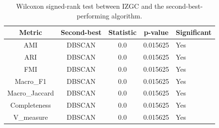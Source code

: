 
\begin{table}[ht]
\centering
\caption{Wilcoxon signed-rank test between IZGC and the second-best-performing algorithm.}
\label{tab:wilcoxon}

\begin{tabular}{cccc}
\toprule
Metric & Second-best & Statistic & p-value & Significant & \\
\midrule
AMI & DBSCAN & 0.0 & 0.015625 & Yes\\
ARI & DBSCAN & 0.0 & 0.015625 & Yes\\
FMI & DBSCAN & 0.0 & 0.015625 & Yes\\
Macro_F1 & DBSCAN & 0.0 & 0.015625 & Yes\\
Macro_Jaccard & DBSCAN & 0.0 & 0.015625 & Yes\\
Completeness & DBSCAN & 0.0 & 0.015625 & Yes\\
V_measure & DBSCAN & 0.0 & 0.015625 & Yes\\

\bottomrule
\end{tabular}
\end{table}
